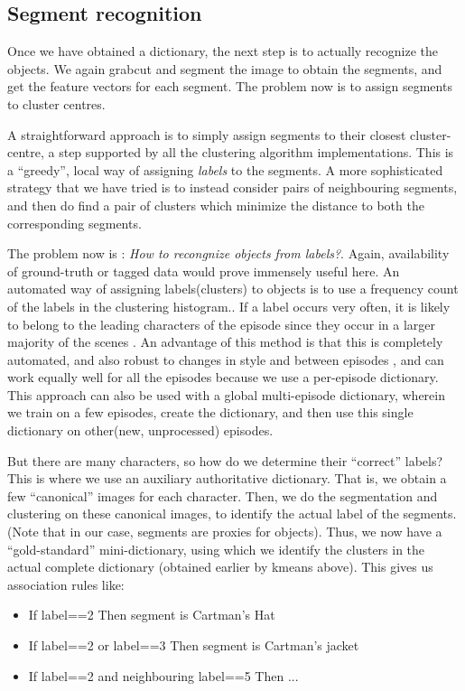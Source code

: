 \documentclass[10pt,twocolumn,letterpaper]{article}
\begin{document}
\subsection{Segment recognition}

Once we have obtained a dictionary, the next step is to actually
recognize the objects. We again grabcut and segment the image to
obtain the segments, and get the feature vectors for each segment. The
problem now is to assign segments to cluster centres.

A straightforward approach is to simply assign segments to their
closest cluster-centre, a step supported by all the clustering
algorithm implementations. This is a ``greedy'', local way of
assigning \emph{labels} to the segments. A more sophisticated strategy
that we have tried is to instead consider pairs of neighbouring
segments, and then do find a pair of clusters which minimize the
distance to both the corresponding segments. 

The problem now is : \emph{How to recongnize objects from labels?}.
Again, availability of ground-truth or tagged data would prove
immensely useful here. An automated way of assigning labels(clusters)
to objects is to use a frequency count of the labels in the clustering
histogram.. If a label occurs very often, it is likely to belong to
the leading characters of the episode since they occur in a larger
majority of the scenes . An advantage of this method is that this is
completely automated, and also robust to changes in style and between
episodes , and can work equally well for all the episodes because we
use a per-episode dictionary. This approach can also be used with a
global multi-episode dictionary, wherein we train on a few episodes,
create the dictionary, and then use this single dictionary on
other(new, unprocessed) episodes.

But there are many characters, so how do we determine their
``correct'' labels?  This is where we use an auxiliary authoritative
dictionary. That is, we obtain a few ``canonical'' images for each
character. Then, we do the segmentation and clustering on these
canonical images, to identify the actual label of the segments. (Note
that in our case, segments are proxies for objects). Thus, we now have
a ``gold-standard'' mini-dictionary, using which we identify the
clusters in the actual complete dictionary (obtained earlier by kmeans
above). This gives us association rules like:

\begin{itemize}
\item If label==2 Then segment is Cartman's Hat
\item If label==2 or label==3 Then segment is Cartman's jacket
\item If label==2 and neighbouring label==5 Then ...
\end{itemize}
\end{document}
